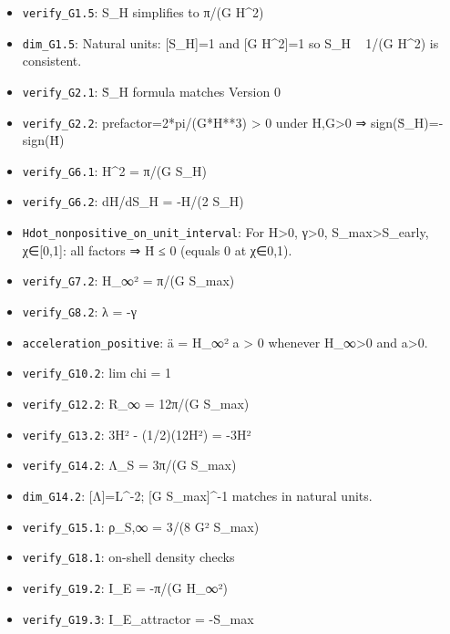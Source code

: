 \documentclass[11pt,a4paper]{article}
\theoremstyle{remark}\newtheorem*{caution}{Caution}
\begin{document}
\begin{itemize}\setlength{\itemsep}{0.1em}
\item [\textcolor{green!50!black}{PASS}] \texttt{verify\_G1.5}: S\_H simplifies to π/(G H^2)
\item [\textcolor{green!50!black}{PASS}] \texttt{dim\_G1.5}: Natural units: [S\_H]=1 and [G H^2]=1 so S\_H ~ 1/(G H^2) is consistent.
\item [\textcolor{green!50!black}{PASS}] \texttt{verify\_G2.1}: Ṡ\_H formula matches Version 0
\item [\textcolor{green!50!black}{PASS}] \texttt{verify\_G2.2}: prefactor=2*pi/(G*H**3) > 0 under H,G>0 ⇒ sign(Ṡ\_H)=-sign(Ḣ)
\item [\textcolor{green!50!black}{PASS}] \texttt{verify\_G6.1}: H^2 = π/(G S\_H)
\item [\textcolor{green!50!black}{PASS}] \texttt{verify\_G6.2}: dH/dS\_H = -H/(2 S\_H)
\item [\textcolor{green!50!black}{PASS}] \texttt{Hdot\_nonpositive\_on\_unit\_interval}: For H>0, γ>0, S\_max>S\_early, χ∈[0,1]: all factors ⇒ Ḣ ≤ 0 (equals 0 at χ∈{0,1}).
\item [\textcolor{green!50!black}{PASS}] \texttt{verify\_G7.2}: H\_∞² = π/(G S\_max)
\item [\textcolor{green!50!black}{PASS}] \texttt{verify\_G8.2}: λ = -γ
\item [\textcolor{green!50!black}{PASS}] \texttt{acceleration\_positive}: ä = H\_∞² a > 0 whenever H\_∞>0 and a>0.
\item [\textcolor{green!50!black}{PASS}] \texttt{verify\_G10.2}: lim chi = 1
\item [\textcolor{green!50!black}{PASS}] \texttt{verify\_G12.2}: R\_∞ = 12π/(G S\_max)
\item [\textcolor{green!50!black}{PASS}] \texttt{verify\_G13.2}: 3H² - (1/2)(12H²) = -3H²
\item [\textcolor{green!50!black}{PASS}] \texttt{verify\_G14.2}: Λ\_S = 3π/(G S\_max)
\item [\textcolor{green!50!black}{PASS}] \texttt{dim\_G14.2}: [Λ]=L^{-2}; [G S\_max]^{-1} matches in natural units.
\item [\textcolor{green!50!black}{PASS}] \texttt{verify\_G15.1}: ρ\_S,∞ = 3/(8 G² S\_max)
\item [\textcolor{green!50!black}{PASS}] \texttt{verify\_G18.1}: on-shell density checks
\item [\textcolor{green!50!black}{PASS}] \texttt{verify\_G19.2}: I\_E = -π/(G H\_∞²)
\item [\textcolor{green!50!black}{PASS}] \texttt{verify\_G19.3}: I\_E\_attractor = -S\_max

\end{itemize}
\end{document}
